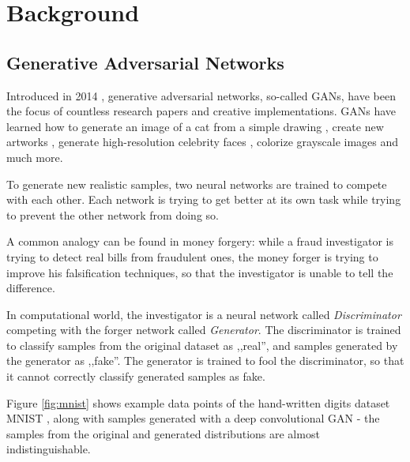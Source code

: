 \documentclass[12pt]{report}
\begin{document}
\newpage
\chapter{Background}
\section{Generative Adversarial Networks}

Introduced in 2014 \cite{goodfellow_generative_2014}, generative adversarial  networks, so-called GANs, have been the focus of countless research papers and creative implementations. GANs have learned how to generate an image of a cat from a simple drawing \cite{hesse_image--image_nodate}, create new artworks \cite{rkjones4_gangogh_2018}, generate high-resolution celebrity faces \cite{karras_progressive_2017}, colorize grayscale images and much more.

To generate new realistic samples, two neural networks are trained to compete with each other. Each network is trying to get better at its own task while trying to prevent the other network from doing so. 

A common analogy can be found in money forgery: while a fraud investigator is trying to detect real bills from fraudulent ones, the money forger is trying to improve his falsification techniques, so that the investigator is unable to tell the difference.

In computational world, the investigator is a neural network called \textit{Discriminator} competing with the forger network called \textit{Generator}. The discriminator is trained to classify samples from the original dataset as ,,real'', and samples generated by the generator as ,,fake''. The generator is trained to fool the discriminator, so that it cannot correctly classify generated samples as fake.

\pagebreak
Figure \ref{fig:mnist} shows example data points of the hand-written digits dataset MNIST \cite{lecun_mnist_nodate}, along with samples generated with a deep convolutional GAN \cite{kim_dcgan-tensorflow_2018} - the samples from the original and generated distributions are almost indistinguishable.
\end{document}
